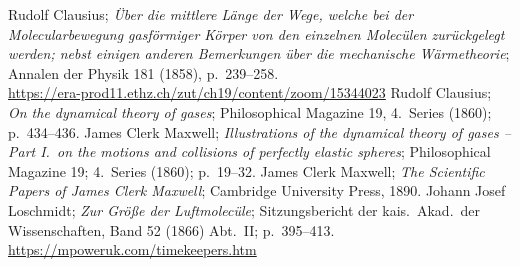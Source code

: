 \begin{thebibliography}{99}
 Rudolf Clausius; \textit{\"Uber die mittlere L\"ange der Wege, welche bei der
       Molecularbewegung gasf\"ormiger K\"orper von den einzelnen Molec\"ulen zur\"uckgelegt werden;
       nebst einigen anderen Bemerkungen \"uber die mechanische W\"armetheorie}; Annalen der Physik 181 (1858),
       p.\ 239--258. \\
       \url{https://era-prod11.ethz.ch/zut/ch19/content/zoom/15344023}
 Rudolf Clausius; \textit{On the dynamical theory of gases}; Philosophical Magazine 19,
         4.\ Series (1860); p.\ 434--436. 
 James Clerk Maxwell; \textit{Illustrations of the dynamical theory of gases -- Part I.\ on the
           motions and collisions of perfectly elastic spheres}; Philosophical Magazine 19; 4.\ Series (1860); 
           p.\ 19--32.               
 James Clerk Maxwell; \textit{The Scientific Papers of James Clerk Maxwell}; Cambridge
              University Press, 1890.            
 Johann Josef Loschmidt; \textit{Zur Gr\"o\ss e der Luftmolec\"ule}; Sitzungsbericht der kais.\ Akad.\
           der Wissenschaften, Band 52 (1866) Abt.\ II; p.\ 395--413.  
           \url{https://mpoweruk.com/timekeepers.htm}
\end{thebibliography}


%

